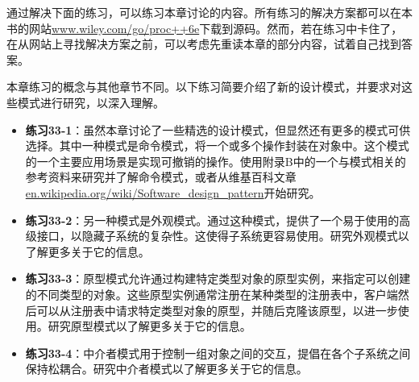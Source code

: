 通过解决下面的练习，可以练习本章讨论的内容。所有练习的解决方案都可以在本书的网站\url{www.wiley.com/go/proc++6e}下载到源码。然而，若在练习中卡住了，在从网站上寻找解决方案之前，可以考虑先重读本章的部分内容，试着自己找到答案。

本章练习的概念与其他章节不同。以下练习简要介绍了新的设计模式，并要求对这些模式进行研究，以深入理解。

\begin{itemize}
\item
\textbf{练习33-1}：虽然本章讨论了一些精选的设计模式，但显然还有更多的模式可供选择。其中一种模式是命令模式，将一个或多个操作封装在对象中。这个模式的一个主要应用场景是实现可撤销的操作。使用附录B中的一个与模式相关的参考资料来研究并了解命令模式，或者从维基百科文章\url{en.wikipedia.org/wiki/Software_design_pattern}开始研究。

\item
\textbf{练习33-2}：另一种模式是外观模式。通过这种模式，提供了一个易于使用的高级接口，以隐藏子系统的复杂性。这使得子系统更容易使用。研究外观模式以了解更多关于它的信息。

\item
\textbf{练习33-3}：原型模式允许通过构建特定类型对象的原型实例，来指定可以创建的不同类型的对象。这些原型实例通常注册在某种类型的注册表中，客户端然后可以从注册表中请求特定类型对象的原型，并随后克隆该原型，以进一步使用。研究原型模式以了解更多关于它的信息。

\item
\textbf{练习33-4}：中介者模式用于控制一组对象之间的交互，提倡在各个子系统之间保持松耦合。研究中介者模式以了解更多关于它的信息。
\end{itemize}












